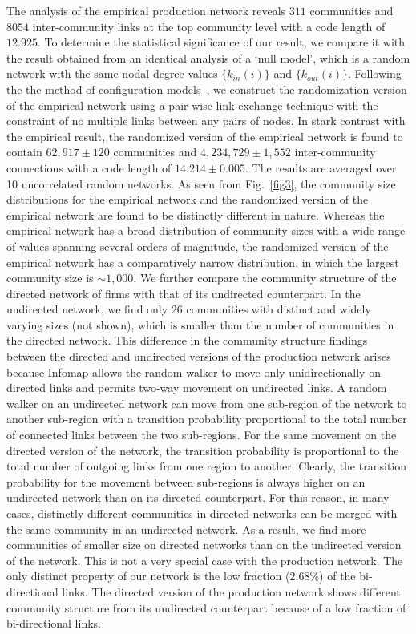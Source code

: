 \documentclass[pre,floatfix,twocolumn,showpacs,a4paper,nofootinbib]{revtex4}
\begin{document}
The analysis of the empirical production network reveals $311$ communities and 
$8054$ inter-community links at the top community level with a code length of $12.925$. To determine the statistical significance of our result, we compare it with the result obtained from an identical 
analysis of a `null model', which is a random network with the same nodal degree values $\{k_{in}(i)\}$ and $\{k_{out}(i)\}$.
Following the the method of configuration models~\cite{newman2010networks}, we construct the randomization version of the empirical network using a pair-wise link exchange technique with 
the constraint of no multiple links between any pairs of nodes. 
In stark contrast with the empirical result, the randomized version of the empirical network is found to contain $ 62, 917 \pm 120$ communities and $4, 234, 729 \pm 1, 552$ inter-community connections with
a code length of $14.214 \pm 0.005$. The results are averaged over 10 uncorrelated random networks. 
As seen from Fig.~\ref{fig3}, the community size distributions for the empirical network and the randomized version of the empirical 
network are found to be distinctly different in nature. Whereas the empirical network has a broad distribution of community sizes with a wide range of values 
spanning several orders of magnitude, the randomized version of the empirical network has a comparatively narrow distribution, in which the largest community
size is $\sim 1, 000$. 
We further compare the community structure of the directed network of firms with that of its undirected counterpart. In the undirected network, we find
only $26$ communities with distinct and widely varying sizes (not shown), which is smaller than the number
of communities in the directed network. This difference in the community structure findings between the directed and undirected versions of the production network 
arises because Infomap allows the random walker to move only unidirectionally on directed links and permits two-way movement on undirected links.
A random walker on an undirected network can move from one sub-region  of the network to another sub-region  with a transition probability 
proportional to the total number of connected links between the two sub-regions. For the same movement on the directed version of the network, 
the transition probability is proportional to the total number of outgoing links from one region  to another.  Clearly, the 
transition probability for the movement between sub-regions is always higher on an undirected network than on its directed counterpart. 
For this reason, in many cases, distinctly different communities in directed networks can be merged with the same community in 
an undirected network. As a result, we find more communities of smaller size on directed networks than on the 
undirected version of the network. 
This is not a very special case with the production network.
The only distinct property of our network is the low fraction ($2.68 \%$) of the bi-directional links. 
The directed version of the production network shows different community structure from its undirected  counterpart because of a low fraction of bi-directional links. 
\end{document}
